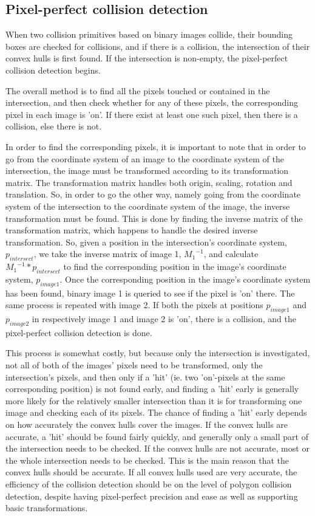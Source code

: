 
\subsection{Pixel-perfect collision detection}

When two collision primitives based on binary images collide,
their bounding boxes are checked for collisions, and if there
is a collision, the intersection of their convex hulls is first found.
If the intersection is non-empty, the pixel-perfect collision detection
begins.

The overall method is to find all the pixels touched or contained
in the intersection, and then check whether for any of these pixels,
the corresponding pixel in each image is 'on'. If there exist at least
one such pixel, then there is a collision, else there is not.

In order to find the corresponding pixels, it is important to note
that in order to go from the coordinate system of an image
to the coordinate system of the intersection,
the image must be transformed according to its transformation matrix.
The transformation matrix handles both origin, scaling, rotation
and translation. So, in order to go the other way, namely going from
the coordinate system of the intersection to the coordinate system
of the image, the inverse transformation must be found.
This is done by finding the inverse matrix of the transformation
matrix, which happens to handle the desired inverse transformation.
So, given a position in the intersection's coordinate system, $p_{intersect}$,
we take the inverse matrix of image 1, ${M_1}^{-1}$, and calculate ${M_1}^{-1} * p_{intersect}$
to find the corresponding position in the image's coordinate system, $p_{image1}$.
Once the corresponding position in the image's coordinate system has been found,
binary image 1 is queried to see if the pixel is 'on' there.
The same process is repeated with image 2.
If both the pixels at positions $p_{image1}$ and $p_{image2}$ in
respectively image 1 and image 2 is 'on', there is a collision,
and the pixel-perfect collision detection is done.

This process is somewhat costly, but because only the intersection
is investigated, not all of both of the images' pixels need to be transformed,
only the intersection's pixels, and then only if a 'hit' (ie. two 'on'-pixels at the same
corresponding position) is not found early,
and finding a 'hit' early is generally more likely for the relatively smaller intersection
than it is for transforming one image and checking each of its pixels.
The chance of finding a 'hit' early depends on how accurately the convex hulls
cover the images. If the convex hulls are accurate, a 'hit' should be found fairly
quickly, and generally only a small part of the intersection needs to be checked.
If the convex hulls are not accurate, most or the whole intersection needs to be checked.
This is the main reason that the convex hulls should be accurate.
If all convex hulls used are very accurate, the efficiency of the collision detection
should be on the level of polygon collision detection, despite having pixel-perfect
precision and ease as well as supporting basic transformations.

